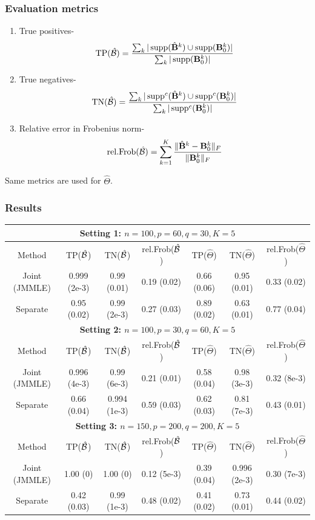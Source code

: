 \documentclass[10pt]{beamer}
\theoremstyle{definition}
\DeclareMathOperator*{\supp}{\text{supp}}
\begin{document}
\begin{frame}
\frametitle{Evaluation metrics}
\begin{enumerate}
\item True positives-
%
\[
\text{TP} (\hat \cB) = \frac{\sum_k | \supp(\hat \bfB^k) \cup \supp (\bfB_0^k)|}{\sum_k | \supp (\bfB_0^k)| }
\]
\item True negatives-
%
\[
\text{TN} (\hat \cB) = \frac{\sum_k | \supp^c(\hat \bfB^k) \cup \supp^c (\bfB_0^k)|}{\sum_k | \supp^c (\bfB_0^k)| }
\]
%
\item Relative error in Frobenius norm-
%
\[
\text{rel.Frob} (\hat {{\cal{B}}}) = \sum_{k=1}^K \frac{\| \hat {{\mathbf{B}}}^k - {\mathbf{B}}_0^k \|_F}{\| {\mathbf{B}}_0^k \|_F}
\]
%
\end{enumerate}

Same metrics are used for $\hat \Theta$.
\end{frame}
\begin{frame}
\frametitle{Results}

\begin{scriptsize}
\begin{table}
    \begin{tabular}{c|ccc|ccc}
    \hline
    \multicolumn{7}{c}{{\bf Setting 1: $n=100, p=60, q=30, K=5$}}\\\hline
    Method        & TP($\hat{{\cal{B}}}$)         & TN($\hat{{\cal{B}}}$)         & rel.Frob($\hat{{\cal{B}}}$) & TP($\hat\Theta$)   & TN($\hat\Theta$)   & rel.Frob($\hat\Theta$) \\\hline
    Joint (JMMLE) & 0.999 (2e-3) & 0.99 (0.01)   & 0.19 (0.02)  & 0.66 (0.06) & 0.95 (0.01) & 0.33 (0.02)      \\
    Separate      & 0.95 (0.02)   & 0.99  (2e-3) & 0.27 (0.03)  & 0.89 (0.02) & 0.63 (0.01) & 0.77 (0.04)      \\\hline
    \multicolumn{7}{c}{{\bf Setting 2: $n=100, p=30, q=60, K=5$}}\\\hline
    Method        & TP($\hat{{\cal{B}}}$)         & TN($\hat{{\cal{B}}}$)         & rel.Frob($\hat{{\cal{B}}}$) & TP($\hat\Theta$)   & TN($\hat\Theta$)   & rel.Frob($\hat\Theta$) \\\hline
    Joint (JMMLE) & 0.996 (4e-3) & 0.99 (6e-3)   & 0.21 (0.01)  & 0.58 (0.04) & 0.98 (3e-3) & 0.32 (8e-3)      \\
    Separate      & 0.66 (0.04)  & 0.994  (1e-3) & 0.59 (0.03)  & 0.62 (0.03) & 0.81 (7e-3) & 0.43 (0.01)      \\\hline
    \multicolumn{7}{c}{{\bf Setting 3: $n=150, p=200, q=200, K=5$}}\\\hline
    Method        & TP($\hat{{\cal{B}}}$)         & TN($\hat{{\cal{B}}}$)         & rel.Frob($\hat{{\cal{B}}}$) & TP($\hat\Theta$)   & TN($\hat\Theta$)   & rel.Frob($\hat\Theta$) \\\hline
    Joint (JMMLE) & 1.00 (0) & 1.00 (0)   & 0.12 (5e-3)  & 0.39 (0.04) & 0.996 (2e-3) & 0.30 (7e-3)      \\
    Separate      & 0.42 (0.03)   & 0.99  (1e-3) & 0.48 (0.02)  & 0.41 (0.02) & 0.73 (0.01) & 0.44 (0.02)      \\\hline
    \end{tabular}
\end{table}
\end{scriptsize}
\end{frame}
\end{document}
